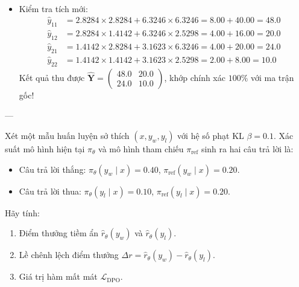 \begin{itemize}
  Ma trận trọng số mới:
  \begin{equation*}
  \hat{\mathbf{W}} = \text{diag}(\mathbf{s}) \cdot \mathbf{W} = \begin{pmatrix} 0.707107 \times 4.0 & 0.707107 \times 2.0 \\ 12.64911 \times 0.5 & 12.64911 \times 0.2 \end{pmatrix} \approx \begin{pmatrix} 2.8284 & 1.4142 \\ 6.3246 & 2.5298 \end{pmatrix}
  \end{equation*}

  \item[4)] Kiểm tra tích mới:
  \begin{align*}
  \hat{y}_{11} &= 2.8284 \times 2.8284 + 6.3246 \times 6.3246 = 8.00 + 40.00 = 48.0 \\
  \hat{y}_{12} &= 2.8284 \times 1.4142 + 6.3246 \times 2.5298 = 4.00 + 16.00 = 20.0 \\
  \hat{y}_{21} &= 1.4142 \times 2.8284 + 3.1623 \times 6.3246 = 4.00 + 20.00 = 24.0 \\
  \hat{y}_{22} &= 1.4142 \times 1.4142 + 3.1623 \times 2.5298 = 2.00 + 8.00 = 10.0
  \end{align*}
  Kết quả thu được $\hat{\mathbf{Y}} = \begin{pmatrix} 48.0 & 20.0 \\ 24.0 & 10.0 \end{pmatrix}$, khớp chính xác $100\%$ với ma trận gốc!
\end{itemize}

---

\begin{example}
Xét một mẫu huấn luyện sở thích $(x, y_w, y_l)$ với hệ số phạt KL $\beta = 0.1$.
Xác suất mô hình hiện tại $\pi_\theta$ và mô hình tham chiếu $\pi_{\text{ref}}$ sinh ra hai câu trả lời là:
\begin{itemize}
  \item Câu trả lời thắng: $\pi_\theta(y_w \mid x) = 0.40$, $\pi_{\text{ref}}(y_w \mid x) = 0.20$.
  \item Câu trả lời thua: $\pi_\theta(y_l \mid x) = 0.10$, $\pi_{\text{ref}}(y_l \mid x) = 0.20$.
\end{itemize}
Hãy tính:
\begin{enumerate}
  \item Điểm thưởng tiềm ẩn $\hat{r}_\theta(y_w)$ và $\hat{r}_\theta(y_l)$.
  \item Lề chênh lệch điểm thưởng $\Delta r = \hat{r}_\theta(y_w) - \hat{r}_\theta(y_l)$.
  \item Giá trị hàm mất mát $\mathcal{L}_{\text{DPO}}$.
\end{enumerate}
\end{example}

